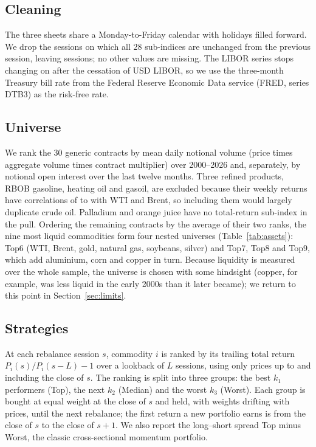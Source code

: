 \documentclass[commodities,article,submit,pdftex,moreauthors]{Definitions/mdpi}
\begin{document}
\subsection{Cleaning}

The three sheets share a Monday-to-Friday calendar with holidays filled forward. We drop the \holidays{} sessions on which all 28 sub-indices are unchanged from the previous session, leaving \sessionsClean{} sessions; no other values are missing. The LIBOR series stops changing on \liborLast{} after the cessation of USD LIBOR, so we use the three-month Treasury bill rate from the Federal Reserve Economic Data service (FRED, series DTB3) as the risk-free rate.

\subsection{Universe}

We rank the 30 generic contracts by mean daily notional volume (price times aggregate volume times contract multiplier) over 2000--2026 and, separately, by notional open interest over the last twelve months. Three refined products, RBOB gasoline, heating oil and gasoil, are excluded because their weekly returns have correlations of  to  with WTI and Brent, so including them would largely duplicate crude oil. Palladium and orange juice have no total-return sub-index in the pull. Ordering the remaining contracts by the average of their two ranks, the nine most liquid commodities form four nested universes (Table~\ref{tab:assets}): Top6 (WTI, Brent, gold, natural gas, soybeans, silver) and Top7, Top8 and Top9, which add aluminium, corn and copper in turn. Because liquidity is measured over the whole sample, the universe is chosen with some hindsight (copper, for example, was less liquid in the early 2000s than it later became); we return to this point in Section~\ref{sec:limits}.



\subsection{Strategies}\label{sec:method}

At each rebalance session $s$, commodity $i$ is ranked by its trailing total return $P_i(s)/P_i(s-L)-1$ over a lookback of $L$ sessions, using only prices up to and including the close of $s$. The ranking is split into three groups: the best $k_1$ performers (Top), the next $k_2$ (Median) and the worst $k_3$ (Worst). Each group is bought at equal weight at the close of $s$ and held, with weights drifting with prices, until the next rebalance; the first return a new portfolio earns is from the close of $s$ to the close of $s+1$. We also report the long--short spread Top minus Worst, the classic cross-sectional momentum portfolio.
\end{document}
